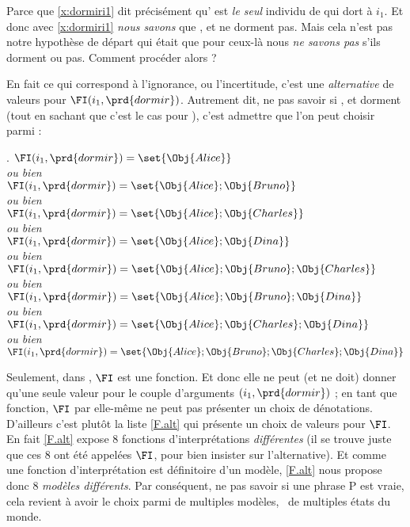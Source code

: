 Parce que \ref{x:dormiri1} dit précisément qu' est
\emph{le seul} individu de {} qui dort à $i_1$.  Et donc avec
\ref{x:dormiri1} \emph{nous savons} que , 
et  ne dorment pas.  Mais cela n'est pas notre hypothèse de
départ qui était que pour ceux-là nous \emph{ne savons pas} s'ils dorment ou
pas.  Comment procéder alors ?

En fait ce qui correspond à l'ignorance, ou l'incertitude, c'est une
\emph{alternative} de valeurs pour \(\FI(i_1,\prd{dormir})\).  Autrement
dit, ne pas savoir si , 
et  dorment (tout en sachant que c'est le cas pour
), c'est admettre que l'on peut choisir parmi :

\ex.  \label{F.alt}
\(\FI(i_1,\prd{dormir}) = \set{\Obj{Alice}}\)
\\\emph{ou bien}\\ 
\(\FI(i_1,\prd{dormir}) = \set{\Obj{Alice};\Obj{Bruno}}\)
\\\emph{ou bien} \\
\(\FI(i_1,\prd{dormir}) = \set{\Obj{Alice};\Obj{Charles}}\)
\\\emph{ou bien}\\ 
\(\FI(i_1,\prd{dormir}) = \set{\Obj{Alice};\Obj{Dina}}\)
\\\emph{ou bien}\\ 
\(\FI(i_1,\prd{dormir}) = \set{\Obj{Alice};\Obj{Bruno};\Obj{Charles}}\)
\\\emph{ou bien}\\
\(\FI(i_1,\prd{dormir}) = \set{\Obj{Alice};\Obj{Bruno};\Obj{Dina}}\)
\\\emph{ou bien}\\
\(\FI(i_1,\prd{dormir}) = \set{\Obj{Alice};\Obj{Charles};\Obj{Dina}}\)
\\\emph{ou bien}\\
\(\FI(i_1,\prd{dormir}) =
\set{\Obj{Alice};\Obj{Bruno};\Obj{Charles};\Obj{Dina}}\) 


Seulement, dans {\Modele}, $\FI$ est une fonction.  Et donc elle ne peut
(et ne doit) donner qu'une seule valeur pour le couple d'arguments $(i_1,\prd{dormir})$ ; en
tant que fonction, $\FI$ par elle-même ne peut pas présenter un choix de
dénotations.   D'ailleurs c'est plutôt la liste \ref{F.alt} qui présente
un choix de valeurs pour $\FI$.  En fait \ref{F.alt} expose 8 fonctions
d'interprétations \emph{différentes} (il se trouve juste que ces 8 ont
été appelées $\FI$, pour bien insister sur l'alternative).  Et comme une
fonction d'interprétation est définitoire d'un modèle, \ref{F.alt} nous
propose donc 8 \emph{modèles différents}.  Par conséquent, ne pas
savoir si une phrase P est vraie, %
cela revient à avoir le choix parmi de {multiples modèles}, \ie\ de multiples états du monde.

